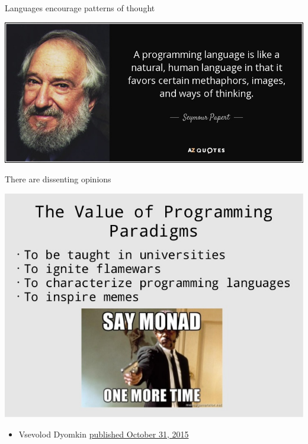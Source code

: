 \documentclass[presetation]{beamer}
\begin{document}
\begin{frame}[label={sec:orga9a6de2}]{Languages encourage patterns of thought}
\begin{center}
\includegraphics[width=.9\linewidth]{./images/papert.jpeg}
\end{center}
\end{frame}

\begin{frame}[label={sec:org7075503}]{There are dissenting opinions}
\begin{center}
\includegraphics[width=.9\linewidth]{./images/noVal.jpg}
\end{center}
\begin{itemize}
\item Vsevolod Dyomkin \href{https://www.slideshare.net/vseloved/can-functional-programming-be-liberated-from-static-typing}{published October 31, 2015}
\end{itemize}
\end{frame}
\end{document}
